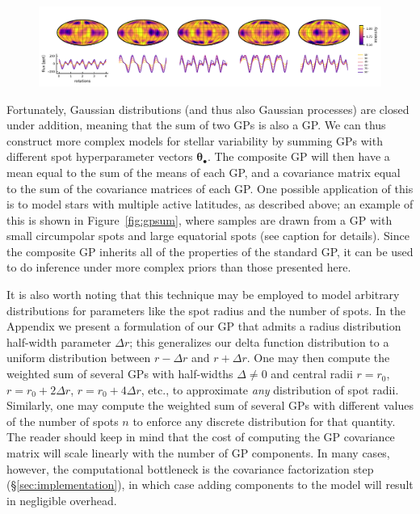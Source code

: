 \documentclass[modern]{aastex62}
\begin{document}
\begin{figure}[t!]
    \begin{centering}
        \includegraphics[width=\linewidth]{figures/gpsum.pdf}
    \end{centering}
\end{figure}

Fortunately, Gaussian distributions (and thus also Gaussian processes) are
closed under addition, meaning that the sum of two GPs is also a GP. We can thus
construct more complex models for stellar variability by summing GPs with different
spot hyperparameter vectors $\pmb{\theta}_\bullet$. The composite GP will then
have a mean equal to the sum of the means of each GP, and a covariance matrix equal
to the sum of the covariance matrices of each GP. One possible application of this
is to model stars with multiple active latitudes, as described above; an example
of this is shown in Figure~\ref{fig:gpsum}, where samples are drawn from a GP with
small circumpolar spots and large equatorial spots (see caption for details).
Since the composite GP inherits all of the properties of the standard GP, it can
be used to do inference under more complex priors than those presented here.

It is also worth noting that this technique may be employed to model arbitrary
distributions for parameters like the spot radius and the number of spots. In
the Appendix we present a formulation of our GP that admits a radius distribution
half-width parameter $\Delta r$; this generalizes our delta function distribution to
a uniform distribution between $r - \Delta r$ and $r + \Delta r$. One may then
compute the weighted sum of several GPs
with half-widths $\Delta \ne 0$ and central radii
$r = r_0$,
$r = r_0 + 2\Delta r$,
$r = r_0 + 4\Delta r$,
etc., to approximate \emph{any} distribution of spot radii. Similarly, one
may compute the weighted sum of several GPs with different values of the
number of spots $n$ to enforce any discrete distribution for that quantity.
The reader should keep in mind that the cost of computing the GP
covariance matrix will scale linearly with the number of GP components.
In many cases, however, the computational bottleneck is the covariance factorization
step (\S\ref{sec:implementation}), in which case adding components to the
model will result in negligible overhead.
\end{document}
